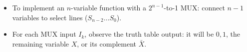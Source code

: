\begin{trickbox}
\begin{itemize}[leftmargin=*]
    \item To implement an $n$-variable function with a $2^{n-1}$-to-1 MUX: connect $n-1$ variables to select lines ($S_{n-2}\dots S_0$).
    \item For each MUX input $I_k$, observe the truth table output: it will be $0, 1$, the remaining variable $X$, or its complement $\bar{X}$.
\end{itemize}
\end{trickbox}
